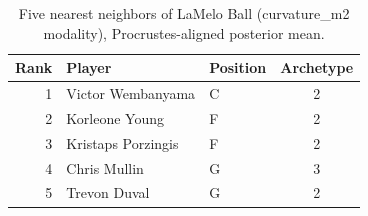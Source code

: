 \begin{table}[htbp]
  \centering\small
  \begin{tabular}{rllc}
    \toprule
    Rank & Player & Position & Archetype \\
    \midrule
    1 & Victor Wembanyama & C & 2 \\
    2 & Korleone Young & F & 2 \\
    3 & Kristaps Porzingis & F & 2 \\
    4 & Chris Mullin & G & 3 \\
    5 & Trevon Duval & G & 2 \\
    \bottomrule
  \end{tabular}
  \caption{Five nearest neighbors of LaMelo Ball (curvature_m2 modality), Procrustes-aligned posterior mean.}
  \label{tab:LaMelo_Ball_neighbors_curvature_m2}
\end{table}

